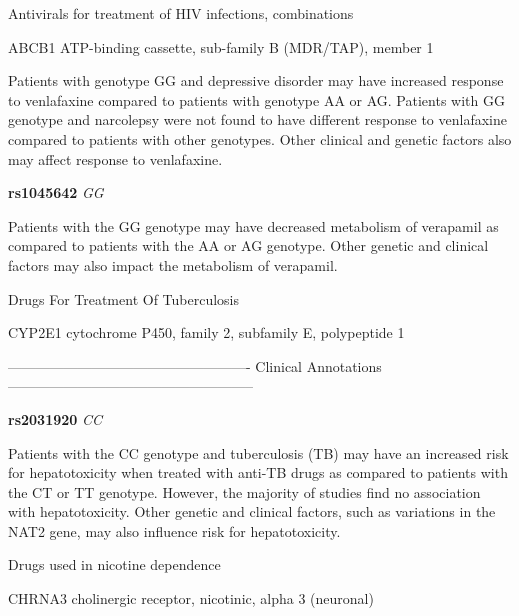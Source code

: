 \documentclass{resume} %
\begin{document}
\begin{rSection}{ Antivirals for treatment of HIV infections, combinations }
\begin{rSubsection}{ ABCB1 }{ ATP-binding cassette, sub-family B (MDR/TAP), member 1 }{}{}
\item[] Patients with genotype GG and depressive disorder may have increased response to venlafaxine compared to patients with genotype AA or AG. Patients with GG genotype and narcolepsy were not found to have different response to venlafaxine compared to patients with other genotypes. Other clinical and genetic factors also may affect response to venlafaxine.\item \textbf{ rs1045642 } \textit{ GG }
\item[] Patients with the GG genotype may have decreased metabolism of verapamil as compared to patients with the AA or AG genotype. Other genetic and clinical factors may also impact the metabolism of verapamil.
\end{rSubsection}

\end{rSection}\begin{rSection}{ Drugs For Treatment Of Tuberculosis }
\item[]

\begin{rSubsection}{ CYP2E1 }{ cytochrome P450, family 2, subfamily E, polypeptide 1 }{}{}
\item[]

\item[] ---------------------------------------------------- Clinical Annotations -----------------------------------------------------\newline
\item \textbf{ rs2031920 } \textit{ CC }
\item[] Patients with the CC genotype and tuberculosis (TB) may have an increased risk for hepatotoxicity when treated with anti-TB drugs as compared to patients with the CT or TT genotype. However, the majority of studies find no association with hepatotoxicity. Other genetic and clinical factors, such as variations in the NAT2 gene, may also influence risk for hepatotoxicity.
\end{rSubsection}

\end{rSection}\begin{rSection}{ Drugs used in nicotine dependence }
\item[]

\begin{rSubsection}{ CHRNA3 }{ cholinergic receptor, nicotinic, alpha 3 (neuronal) }{}{}
\item[]


\end{rSubsection}
\end{rSection}
\end{document}
